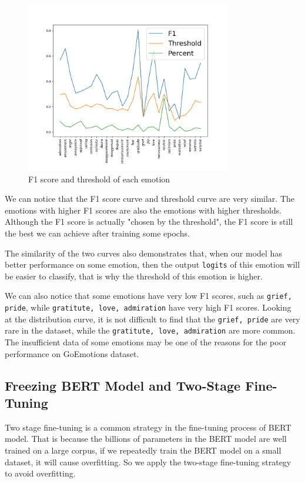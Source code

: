 \documentclass{article}
\begin{document}
\begin{figure}[H]
  \centering
  \includegraphics[width=0.8\textwidth]{img4.png}
  \caption{F1 score and threshold of each emotion}
\end{figure}

We can notice that the F1 score curve and threshold curve are very similar. The emotions with higher F1 scores are also the emotions with higher thresholds.
Although the F1 score is actually "chosen by the threshold", the F1 score is still the best we can achieve after training some epochs.

The similarity of the two curves also demonstrates that, when our model has better performance on some emotion, then the output \texttt{logits} of this emotion will be easier to classify, that is why the threshold of this emotion is higher.

We can also notice that some emotions have very low F1 scores, such as \texttt{grief, pride}, while \texttt{gratitute, love, admiration} have very high F1 scores.
Looking at the distribution curve, it is not difficult to find that the \texttt{grief, pride} are very rare in the dataset, while the \texttt{gratitute, love, admiration} are more common. The insufficient data of some emotions may be one of the reasons for the poor performance on GoEmotions dataset.

\subsection{Freezing BERT Model and Two-Stage Fine-Tuning}

Two stage fine-tuning is a common strategy in the fine-tuning process of BERT model. That is because the billions of parameters in the BERT model are well trained on a large corpus, if we repeatedly train the BERT model on a small dataset, it will cause overfitting. So we apply the two-stage fine-tuning strategy to avoid overfitting.
\end{document}
